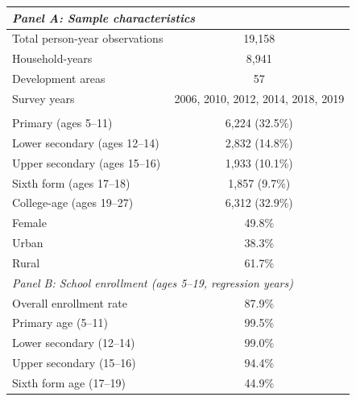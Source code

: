 \begin{tabular}{lc}
   \tabularnewline \midrule \midrule
\multicolumn{2}{l}{\emph{Panel A: Sample characteristics}} \\
\midrule
Total person-year observations & 19,158 \\
Household-years & 8,941 \\
Development areas & 57 \\
Survey years & 2006, 2010, 2012, 2014, 2018, 2019 \\
\addlinespace
\multicolumn{2}{l}{\emph{Age group composition (\% of sample)}} \\
\hspace{0.75em}Primary (ages 5--11) & 6,224 (32.5\%) \\
\hspace{0.75em}Lower secondary (ages 12--14) & 2,832 (14.8\%) \\
\hspace{0.75em}Upper secondary (ages 15--16) & 1,933 (10.1\%) \\
\hspace{0.75em}Sixth form (ages 17--18) & 1,857 (9.7\%) \\
\hspace{0.75em}College-age (ages 19--27) & 6,312 (32.9\%) \\
\addlinespace
Female & 49.8\% \\
Urban & 38.3\% \\
Rural & 61.7\% \\
\midrule
\multicolumn{2}{l}{\emph{Panel B: School enrollment (ages 5--19, regression years)}} \\
\midrule
Overall enrollment rate & 87.9\% \\
\hspace{0.75em}Primary age (5--11) & 99.5\% \\
\hspace{0.75em}Lower secondary (12--14) & 99.0\% \\
\hspace{0.75em}Upper secondary (15--16) & 94.4\% \\
\hspace{0.75em}Sixth form age (17--19) & 44.9\% \\
\bottomrule
\end{tabular}
